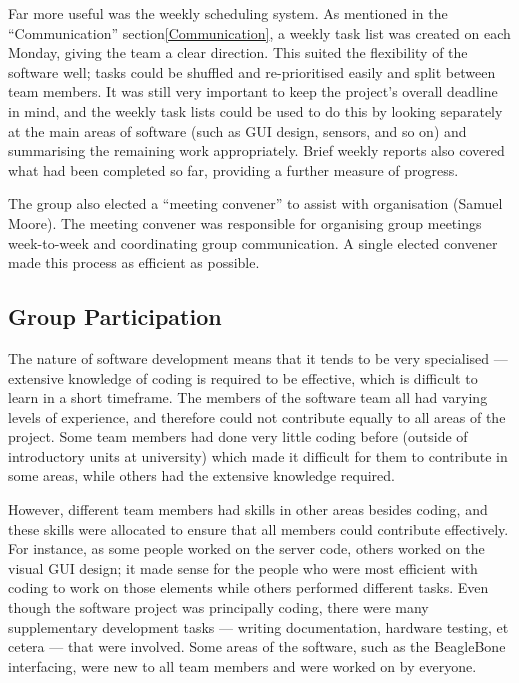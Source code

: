 Far more useful was the weekly scheduling system. As mentioned in the ``Communication'' section\ref{Communication}, a weekly task list was created on each Monday, giving the team a clear direction. This suited the flexibility of the software well; tasks could be shuffled and re-prioritised easily and split between team members. It was still very important to keep the project's overall deadline in mind, and the weekly task lists could be used to do this by looking separately at the main areas of software (such as GUI design, sensors, and so on) and summarising the remaining work appropriately. Brief weekly reports also covered what had been completed so far, providing a further measure of progress.


The group also elected a ``meeting convener'' to assist with organisation (Samuel Moore). The meeting convener was responsible for organising group meetings week-to-week and coordinating group communication. A single elected convener made this process as efficient as possible.

\subsection{Group Participation}

The nature of software development means that it tends to be very specialised --- extensive knowledge of coding is required to be effective, which is difficult to learn in a short timeframe. The members of the software team all had varying levels of experience, and therefore could not contribute equally to all areas of the project. Some team members had done very little coding before (outside of introductory units at university) which made it difficult for them to contribute in some areas, while others had the extensive knowledge required.


However, different team members had skills in other areas besides coding, and these skills were allocated to ensure that all members could contribute effectively. For instance, as some people worked on the server code, others worked on the visual GUI design; it made sense for the people who were most efficient with coding to work on those elements while others performed different tasks. Even though the software project was principally coding, there were many supplementary development tasks --- writing documentation, hardware testing, et cetera --- that were involved. Some areas of the software, such as the BeagleBone interfacing, were new to all team members and were worked on by everyone.


